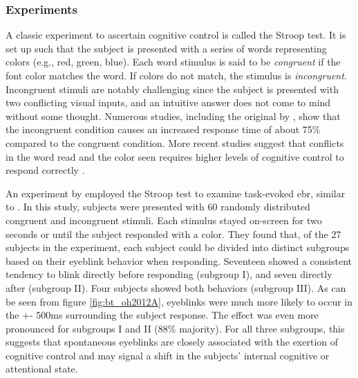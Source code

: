 
\subsubsection{Experiments}

A classic experiment to ascertain cognitive control is called the Stroop test. It is set up such that the subject is presented with a series of words representing colors (e.g., red, green, blue). Each word stimulus is said to be \textit{congruent} if the font color matches the word. If colors do not match, the stimulus is \textit{incongruent}. Incongruent stimuli are notably challenging since the subject is presented with two conflicting visual inputs, and an intuitive answer does not come to mind without some thought. Numerous studies, including the original by \textcite{stroop1935}, show that the incongruent condition causes an increased response time of about 75\% compared to the congruent condition. More recent studies suggest that conflicts in the word read and the color seen requires higher levels of cognitive control to respond correctly \cite{egner2005, bugg2012}. 

An experiment by \textcite{oh2012} employed the Stroop test to examine task-evoked \acrshort{ebr}, similar to \textcite{bochove2012}. In this study, subjects were presented with 60 randomly distributed congruent and incongruent stimuli. Each stimulus stayed on-screen for two seconds or until the subject responded with a color. They found that, of the 27 subjects in the experiment, each subject could be divided into distinct subgroups based on their eyeblink behavior when responding. Seventeen showed a consistent tendency to blink directly before responding (subgroup I), and seven directly after (subgroup II). Four subjects showed both behaviors (subgroup III). As can be seen from figure \ref{fig:bt_oh2012A}, eyeblinks were much more likely to occur in the +- 500ms surrounding the subject response. The effect was even more pronounced for subgroups I and II (88\% majority). For all three subgroups, this suggests that spontaneous eyeblinks are closely associated with the exertion of cognitive control and may signal a shift in the subjects' internal cognitive or attentional state.

